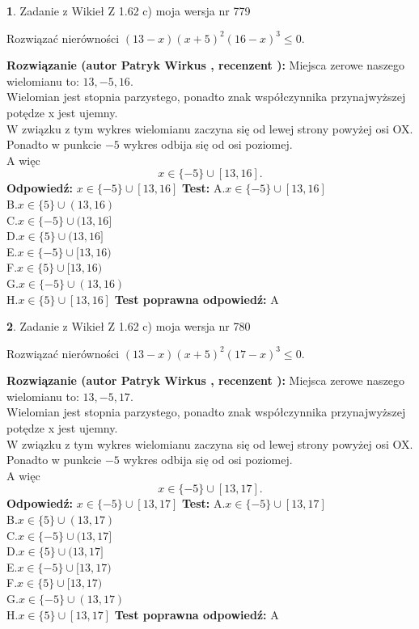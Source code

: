 \documentclass[12pt, a4paper]{article}
\theoremstyle{definition} %
\newtheorem{zad}{}
\newcommand{\zadStart}[1]{\begin{zad}#1\newline}
\newcommand{\zadStop}{\end{zad}}
\newcommand{\rozwStart}[2]{\noindent \textbf{Rozwiązanie (autor #1 , recenzent #2): }\newline}
\newcommand{\rozwStop}{\newline}
\newcommand{\odpStart}{\noindent \textbf{Odpowiedź:}\newline}
\newcommand{\odpStop}{\newline}
\newcommand{\testStart}{\noindent \textbf{Test:}\newline}
\newcommand{\testStop}{\newline}
\newcommand{\kluczStart}{\noindent \textbf{Test poprawna odpowiedź:}\newline}
\newcommand{\kluczStop}{\newline}
\begin{document}
\zadStart{Zadanie z Wikieł Z 1.62 c) moja wersja nr 779}

Rozwiązać nierówności $(13-x)(x+5)^{2}(16-x)^{3}\le0$.
\zadStop
\rozwStart{Patryk Wirkus}{}
Miejsca zerowe naszego wielomianu to: $13, -5, 16$.\\
Wielomian jest stopnia parzystego, ponadto znak współczynnika przy\linebreak najwyższej potędze x jest ujemny.\\ W związku z tym wykres wielomianu zaczyna się od lewej strony powyżej osi OX.\\
Ponadto w punkcie $-5$ wykres odbija się od osi poziomej.\\
A więc $$x \in \{-5\} \cup [13,16].$$
\rozwStop
\odpStart
$x \in \{-5\} \cup [13,16]$
\odpStop
\testStart
A.$x \in \{-5\} \cup [13,16]$\\
B.$x \in \{5\} \cup (13,16)$\\
C.$x \in \{-5\} \cup (13,16]$\\
D.$x \in \{5\} \cup (13,16]$\\
E.$x \in \{-5\} \cup [13,16)$\\
F.$x \in \{5\} \cup [13,16)$\\
G.$x \in \{-5\} \cup (13,16)$\\
H.$x \in \{5\} \cup [13,16]$
\testStop
\kluczStart
A
\kluczStop



\zadStart{Zadanie z Wikieł Z 1.62 c) moja wersja nr 780}

Rozwiązać nierówności $(13-x)(x+5)^{2}(17-x)^{3}\le0$.
\zadStop
\rozwStart{Patryk Wirkus}{}
Miejsca zerowe naszego wielomianu to: $13, -5, 17$.\\
Wielomian jest stopnia parzystego, ponadto znak współczynnika przy\linebreak najwyższej potędze x jest ujemny.\\ W związku z tym wykres wielomianu zaczyna się od lewej strony powyżej osi OX.\\
Ponadto w punkcie $-5$ wykres odbija się od osi poziomej.\\
A więc $$x \in \{-5\} \cup [13,17].$$
\rozwStop
\odpStart
$x \in \{-5\} \cup [13,17]$
\odpStop
\testStart
A.$x \in \{-5\} \cup [13,17]$\\
B.$x \in \{5\} \cup (13,17)$\\
C.$x \in \{-5\} \cup (13,17]$\\
D.$x \in \{5\} \cup (13,17]$\\
E.$x \in \{-5\} \cup [13,17)$\\
F.$x \in \{5\} \cup [13,17)$\\
G.$x \in \{-5\} \cup (13,17)$\\
H.$x \in \{5\} \cup [13,17]$
\testStop
\kluczStart
A
\kluczStop
\end{document}
